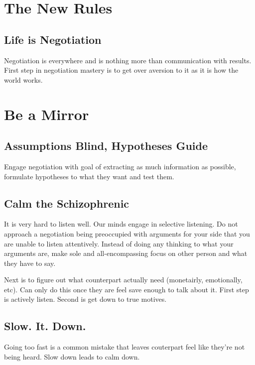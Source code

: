 \documentclass{summary}
\begin{document}
\maketitle %
\tableofcontents %
\thispagestyle{empty} %

\section{The New Rules}
\subsection{Life is Negotiation}
Negotiation is everywhere and is nothing more than communication with results. First step in negotiation mastery is to get over aversion to it as it is how the world works.

\section{Be a Mirror}

\subsection{Assumptions Blind, Hypotheses Guide}
Engage negotiation with goal of extracting as much information as possible, formulate hypotheses to what they want and test them.

\subsection{Calm the Schizophrenic}
It is very hard to listen well. Our minds engage in selective listening. Do not approach a negotiation being preoccupied with arguments for your side that you are unable to listen attentively. Instead of doing any thinking to what your arguments are, make sole and all-encompassing focus on other person and what they have to say.

Next is to figure out what counterpart actually need (monetairly, emotionally, etc). Can only do this once they are feel save enough to talk about it. First step is actively listen. Second is get down to true motives.

\subsection{Slow. It. Down.}
Going too fast is a common mistake that leaves couterpart feel like they're not being heard. Slow down leads to calm down.
\end{document}

